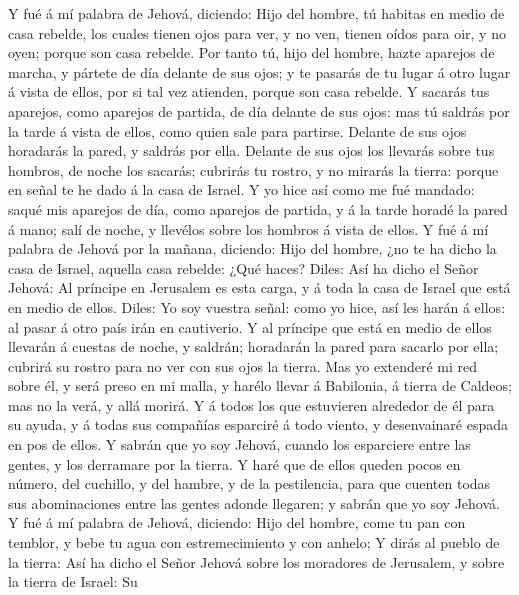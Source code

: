  Y fué á mí palabra de Jehová, diciendo: 
Hijo del hombre, tú habitas en medio de casa rebelde, los cuales tienen
ojos para ver, y no ven, tienen oídos para oir, y no oyen; porque son
casa rebelde.  Por tanto tú, hijo del hombre, hazte
aparejos de marcha, y pártete de día delante de sus ojos; y te pasarás
de tu lugar á otro lugar á vista de ellos, por si tal vez atienden,
porque son casa rebelde.  Y sacarás tus aparejos, como
aparejos de partida, de día delante de sus ojos: mas tú saldrás por la
tarde á vista de ellos, como quien sale para partirse. 
Delante de sus ojos horadarás la pared, y saldrás por ella.
 Delante de sus ojos los llevarás sobre tus hombros, de
noche los sacarás; cubrirás tu rostro, y no mirarás la tierra: porque en
señal te he dado á la casa de Israel.  Y yo hice así como
me fué mandado: saqué mis aparejos de día, como aparejos de partida, y á
la tarde horadé la pared á mano; salí de noche, y llevélos sobre los
hombros á vista de ellos.  Y fué á mí palabra de Jehová
por la mañana, diciendo:  Hijo del hombre, ¿no te ha dicho
la casa de Israel, aquella casa rebelde: ¿Qué haces? 
Diles: Así ha dicho el Señor Jehová: Al príncipe en Jerusalem es esta
carga, y á toda la casa de Israel que está en medio de ellos.
 Diles: Yo soy vuestra señal: como yo hice, así les harán
á ellos: al pasar á otro país irán en cautiverio.  Y al
príncipe que está en medio de ellos llevarán á cuestas de noche, y
saldrán; horadarán la pared para sacarlo por ella; cubrirá su rostro
para no ver con sus ojos la tierra.  Mas yo extenderé mi
red sobre él, y será preso en mi malla, y harélo llevar á Babilonia, á
tierra de Caldeos; mas no la verá, y allá morirá.  Y á
todos los que estuvieren alrededor de él para su ayuda, y á todas sus
compañías esparciré á todo viento, y desenvainaré espada en pos de
ellos.  Y sabrán que yo soy Jehová, cuando los esparciere
entre las gentes, y los derramare por la tierra.  Y haré
que de ellos queden pocos en número, del cuchillo, y del hambre, y de la
pestilencia, para que cuenten todas sus abominaciones entre las gentes
adonde llegaren; y sabrán que yo soy Jehová.  Y fué á mí
palabra de Jehová, diciendo:  Hijo del hombre, come tu
pan con temblor, y bebe tu agua con estremecimiento y con anhelo;
 Y dirás al pueblo de la tierra: Así ha dicho el Señor
Jehová sobre los moradores de Jerusalem, y sobre la tierra de Israel: Su
